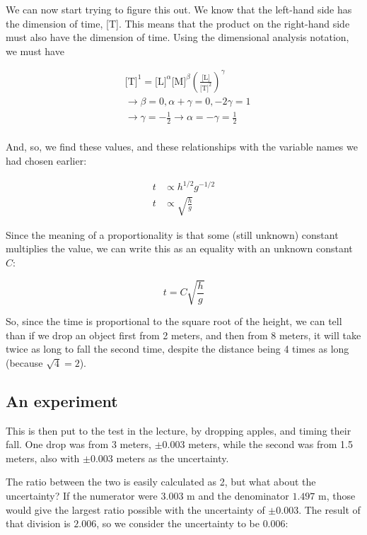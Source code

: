 We can now start trying to figure this out. We know that the left-hand side has the dimension of time, [T]. This means that the product on the right-hand side must also have the dimension of time. Using the dimensional analysis notation, we must have

\begin{align*}
  &\text{[T]}^1 = \text{[L]}^\alpha \text{[M]}^\beta \left( \frac{\text{[L]}}{\text{[T]}^2} \right)^\gamma  \\
  &\rightarrow \beta=0, \alpha+\gamma=0, -2\gamma = 1 \\
  &\rightarrow \gamma = -\frac{1}{2} \rightarrow \alpha=-\gamma=\frac{1}{2} \\
\end{align*}

And, so, we find these values, and these relationships with the variable names we had chosen earlier:

\begin{align}
t &\propto h^{1/2} g^{-1/2} \\
t &\propto \sqrt{\frac{h}{g}}
\end{align}

Since the meaning of a proportionality is that some (still unknown) constant multiplies the value, we can write this as an equality with an unknown constant $C$:

\begin{equation}
 t = C \sqrt{\frac{h}{g}}
\end{equation}

So, since the time is proportional to the square root of the height, we can tell than if we drop an object first from 2 meters, and then from 8 meters, it will take twice as long to fall the second time, despite the distance being 4 times as long (because $\sqrt{4} = 2$).

\subsection{An experiment}

This is then put to the test in the lecture, by dropping apples, and timing their fall. One drop was from 3 meters, $\pm 0.003$ meters, while the second was from 1.5 meters, also with $\pm 0.003$ meters as the uncertainty.

The ratio between the two is easily calculated as 2, but what about the uncertainty? If the numerator were $3.003$ m and the denominator $1.497$ m, those would give the largest ratio possible with the uncertainty of $\pm 0.003$. The result of that division is $2.006$, so we consider the uncertainty to be $0.006$:

